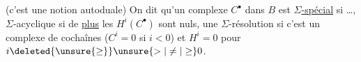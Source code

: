 
(c'est une notion autoduale) On dit qu'un complexe $C^{\bullet}$ dans $B$ est \uline{$\Sigma$-spécial} si …, $\Sigma$-acyclique si de \uline{plus} les $H^i(C^{\bullet})$ sont nuls, une $\Sigma$-résolution si c'est un complexe de cochaînes ($C^i=0$ si $i<0$) et $H^i=0$ pour $i\deleted{\unsure{\geq}}\unsure{>|\neq|\geq}0$.

